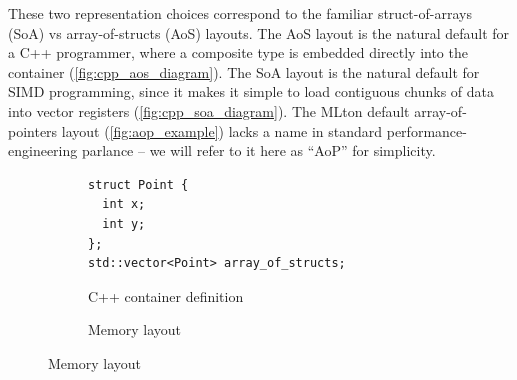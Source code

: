 


These two representation choices correspond to the familiar
struct-of-arrays (SoA) vs array-of-structs (AoS) layouts. The AoS layout is the
natural default for a C++ programmer, where a composite type is embedded
directly into the container (\cref{fig:cpp_aos_diagram}). The SoA layout is the
natural default for SIMD programming, since it makes it simple to load
contiguous chunks of data into vector registers (\cref{fig:cpp_soa_diagram}). The
MLton default array-of-pointers layout (\cref{fig:aop_example}) lacks a name in
standard performance-engineering parlance -- we will refer to it here as ``AoP''
for simplicity.


\begin{figure}[htbp]
  \centering
  \begin{subfigure}[t]{0.45\textwidth}
    \caption{C++ container definition}
    \label{fig:cpp_aos_code}
    \vspace{1mm}
\begin{verbatim}
struct Point {
  int x;
  int y;
};
std::vector<Point> array_of_structs;
\end{verbatim}
  \end{subfigure}\hfill
  \begin{subfigure}[t]{0.53\textwidth}
    \caption{Memory layout}
    \label{fig:cpp_aos_mem}
    \vspace{4mm}
    \centering
\end{subfigure}
\end{figure}
